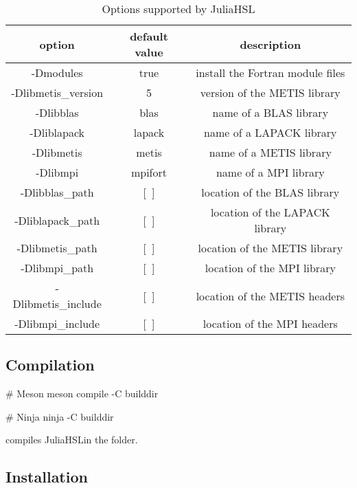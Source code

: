 \documentclass[gdweb]{geradwp}
\newcommand{\JuliaHSL}{JuliaHSL}  %
\begin{document}
\begin{table}[ht]
  \label{tab:options}
  \centering
  \begin{tabular}{|c|c|c|}
    \hline
    option              & default value & description                      \\ \hline
    -Dmodules           & true          & install the Fortran module files \\ \hline
    -Dlibmetis\_version & 5             & version of the METIS library     \\ \hline
    -Dlibblas           & blas          & name of a BLAS library           \\ \hline
    -Dliblapack         & lapack        & name of a LAPACK library         \\ \hline
    -Dlibmetis          & metis         & name of a METIS library          \\ \hline
    -Dlibmpi            & mpifort       & name of a MPI library            \\ \hline
    -Dlibblas\_path     & [~]           & location of the BLAS library     \\ \hline
    -Dliblapack\_path   & [~]           & location of the LAPACK library   \\ \hline
    -Dlibmetis\_path    & [~]           & location of the METIS library    \\ \hline
    -Dlibmpi\_path      & [~]           & location of the MPI library      \\ \hline
    -Dlibmetis\_include & [~]           & location of the METIS headers    \\ \hline
    -Dlibmpi\_include   & [~]           & location of the MPI headers      \\ \hline
  \end{tabular}
  \caption{Options supported by \JuliaHSL}
\end{table}

\subsection{Compilation}

\begin{jllisting}
# Meson
meson compile -C builddir

# Ninja
ninja -C builddir
\end{jllisting}
compiles \JuliaHSL in the  folder.

\subsection{Installation}
\end{document}
